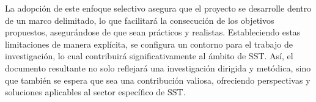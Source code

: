 La adopción de este enfoque selectivo asegura que el proyecto se desarrolle dentro de un marco delimitado, lo que facilitará la consecución de los objetivos propuestos, asegurándose de que sean prácticos y realistas. Estableciendo estas limitaciones de manera explícita, se configura un contorno para el trabajo de investigación, lo cual contribuirá significativamente al ámbito de SST. Así, el documento resultante no solo reflejará una investigación dirigida y metódica, sino que también se espera que sea una contribución valiosa, ofreciendo perspectivas y soluciones aplicables al sector específico de SST.












